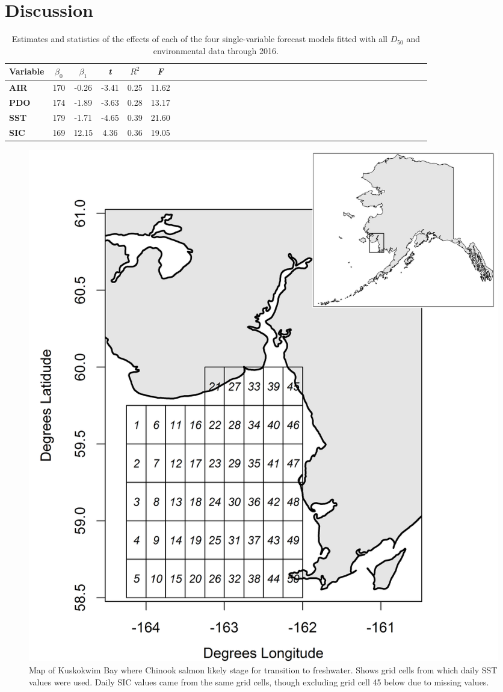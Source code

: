 \documentclass[12pt,]{book}
\theoremstyle{definition}
\theoremstyle{definition}
\theoremstyle{definition}
\theoremstyle{remark}
\begin{document}
\section{Discussion}\label{discussion}

\newpage

\begin{table}

\caption{\label{tab:rt-ests-table}Estimates and statistics of the effects of each of the four single-variable forecast models fitted with all  $D_{50}$ and environmental data through 2016.}
\centering
\begin{tabular}[t]{>{\bfseries}lccccclccccclccccclccccclccccclccccc}
\toprule
Variable & $\beta_0$ & $\beta_1$ & \textit{t} & $R^2$ & \textit{F}\\
\midrule
AIR & 170 & -0.26 & -3.41 & 0.25 & 11.62\\
PDO & 174 & -1.89 & -3.63 & 0.28 & 13.17\\
SST & 179 & -1.71 & -4.65 & 0.39 & 21.60\\
SIC & 169 & 12.15 & 4.36 & 0.36 & 19.05\\
\bottomrule
\end{tabular}
\end{table}

\newpage

\begin{figure}
  \includegraphics{img/Ch2/map.png}
  \caption{Map of Kuskokwim Bay where Chinook salmon likely stage for transition to freshwater. Shows grid cells from which daily SST values were used. Daily SIC values came from the same grid cells, though excluding grid cell 45 below due to missing values.}
  \label{fig:ch2-map2}
\end{figure}
\end{document}
